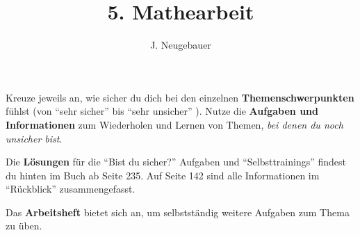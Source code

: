 \documentclass[11pt, a4paper]{scrartcl}
\author{J. Neugebauer}
\title{5. Mathearbeit}
\date{\Heute}
\begin{document}
\CheckupBild\CheckupTitel

Kreuze jeweils an, wie sicher du dich bei den einzelnen \textbf{Themenschwerpunkten} fühlst (von \enquote{sehr sicher}  bis \enquote{sehr unsicher} ). Nutze die \textbf{Aufgaben und Informationen} zum Wiederholen und Lernen von Themen, \emph{bei denen du noch unsicher bist}.

Die \textbf{Lösungen} für die \enquote{Bist du sicher?} Aufgaben und \enquote{Selbsttrainings} findest du hinten im Buch ab Seite 235. Auf Seite 142 sind alle Informationen im \enquote{Rückblick} zusammengefasst.

Das \textbf{Arbeitsheft} bietet sich an, um selbstständig weitere Aufgaben zum Thema zu üben.

\begin{checkup}
\end{checkup}
\end{document}
